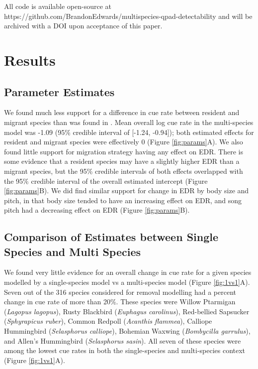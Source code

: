 \documentclass[12pt]{article}
\begin{document}
\par All code is available open-source at https://github.com/BrandonEdwards/multispecies-qpad-detectability and will be archived with a DOI upon acceptance of this paper.


\section{Results}
\subsection{Parameter Estimates}

\par We found much less support for a difference in cue rate between resident and migrant species than was found in \citet{solymos_evaluating_2018}. 
Mean overall log cue rate in the multi-species model was -1.09 (95\% credible interval of [-1.24, -0.94]); both estimated effects for resident and migrant species were effectively 0 (Figure \ref{fig:params}A).
We also found little support for migration strategy having any effect on EDR.
There is some evidence that a resident species may have a slightly higher EDR than a migrant species, but the 95\% credible intervals of both effects overlapped with the 95\% credible interval of the overall estimated intercept (Figure \ref{fig:params}B).
We did find similar support for change in EDR by body size and pitch, in that body size tended to have an increasing effect on EDR, and song pitch had a decreasing effect on EDR (Figure \ref{fig:params}B).

\subsection{Comparison of Estimates between Single Species and Multi Species}

\par We found very little evidence for an overall change in cue rate for a given species modelled by a single-species model vs a multi-species model (Figure \ref{fig:1vs1}A).
Seven out of the 316 species considered for removal modelling had a percent change in cue rate of more than 20\%.
These species were Willow Ptarmigan (\textit{Lagopus lagopus}), Rusty Blackbird (\textit{Euphagus carolinus}), Red-bellied Sapsucker (\textit{Sphyrapicus ruber}), Common Redpoll (\textit{Acanthis flammea}), Calliope Hummingbird (\textit{Selasphorus calliope}), Bohemian Waxwing (\textit{Bombycilla garrulus}), and Allen's Hummingbird (\textit{Selasphorus sasin}).
All seven of these species were among the lowest cue rates in both the single-species and multi-species context (Figure \ref{fig:1vs1}A).
\end{document}
